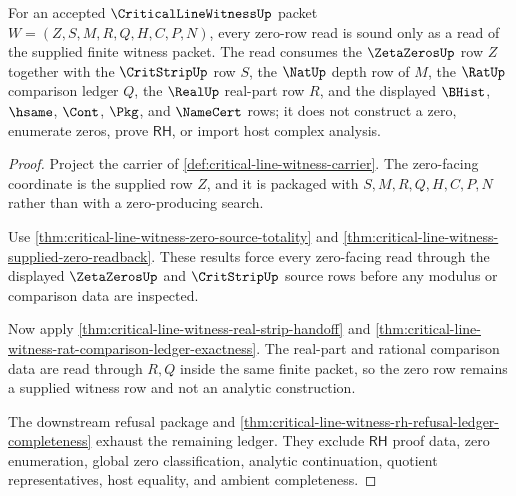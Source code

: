 \begin{theorem}
\label{thm:critical-line-witness-zero-row-soundness}
For an accepted $\CriticalLineWitnessUp$ packet $W=(Z,S,M,R,Q,H,C,P,N)$, every zero-row read is sound only as a read of the supplied finite witness packet. The read consumes the $\ZetaZerosUp$ row $Z$ together with the $\CritStripUp$ row $S$, the $\NatUp$ depth row of $M$, the $\RatUp$ comparison ledger $Q$, the $\RealUp$ real-part row $R$, and the displayed $\BHist$, $\hsame$, $\Cont$, $\Pkg$, and $\NameCert$ rows; it does not construct a zero, enumerate zeros, prove $\mathsf{RH}$, or import host complex analysis.
\end{theorem}
\begin{proof}
Project the carrier of \autoref{def:critical-line-witness-carrier}. The zero-facing coordinate is the supplied row $Z$, and it is packaged with $S,M,R,Q,H,C,P,N$ rather than with a zero-producing search.

Use \autoref{thm:critical-line-witness-zero-source-totality} and \autoref{thm:critical-line-witness-supplied-zero-readback}. These results force every zero-facing read through the displayed $\ZetaZerosUp$ and $\CritStripUp$ source rows before any modulus or comparison data are inspected.

Now apply \autoref{thm:critical-line-witness-real-strip-handoff} and \autoref{thm:critical-line-witness-rat-comparison-ledger-exactness}. The real-part and rational comparison data are read through $R,Q$ inside the same finite packet, so the zero row remains a supplied witness row and not an analytic construction.

The downstream refusal package and \autoref{thm:critical-line-witness-rh-refusal-ledger-completeness} exhaust the remaining ledger. They exclude $\mathsf{RH}$ proof data, zero enumeration, global zero classification, analytic continuation, quotient representatives, host equality, and ambient completeness.
\end{proof}

